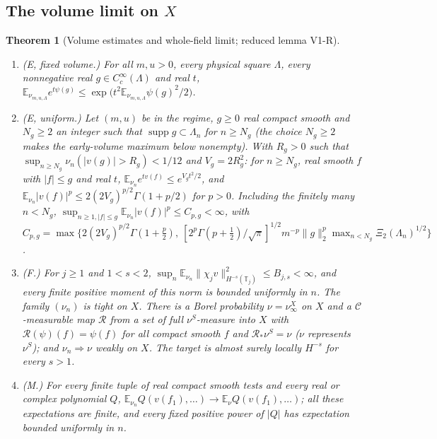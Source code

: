 \documentclass[11pt]{article}
\theoremstyle{plain}
\newtheorem{theorem}{Theorem}[section]
\theoremstyle{definition}
\theoremstyle{remark}
\newcommand{\E}{\mathbb{E}}
\newcommand{\T}{\mathbb{T}}
\newcommand{\cC}{\mathcal{C}}
\DeclareMathOperator{\supp}{supp}
\begin{document}
\subsection{The volume limit on $X$}\label{sec:V1}

\begin{theorem}[Volume estimates and whole-field limit; reduced lemma V1-R]\label{thm:V1}
\begin{enumerate}[label=(\roman*)]
\item \emph{(E, fixed volume.)} For all $m,u>0$, every physical square $\Lambda$, every
  nonnegative real $g\in C_c^{\infty}(\Lambda)$ and real $t$,
  $\E_{\nu_{m,u,\Lambda}}e^{t\psi(g)}\le\exp\bigl(t^{2}\E_{\nu_{m,u,\Lambda}}\psi(g)^{2}/2\bigr)$.
\item \emph{(E, uniform.)} Let $(m,u)$ be in the regime, $g\ge0$ real compact smooth
  and $N_g\ge2$ an integer such that $\supp g\subset\Lambda_n$ for $n\ge N_g$ (the
  choice $N_g\ge2$ makes the early-volume maximum below nonempty). With $R_g>0$ such that
  $\sup_{n\ge N_g}\nu_n(|v(g)|>R_g)<1/12$ and $V_g=2R_g^{2}$: for $n\ge N_g$, real smooth $f$
  with $|f|\le g$ and real $t$, $\E_{\nu_n}e^{tv(f)}\le e^{V_gt^{2}/2}$, and
  $\E_{\nu_n}|v(f)|^{p}\le2(2V_g)^{p/2}\Gamma(1+p/2)$ for $p>0$. Including the finitely many
  $n<N_g$, $\sup_{n\ge1,|f|\le g}\E_{\nu_n}|v(f)|^{p}\le C_{p,g}<\infty$, with
  $C_{p,g}=\max\{2(2V_g)^{p/2}\Gamma(1+\tfrac p2),\ [2^{p}\Gamma(p+\tfrac12)/\sqrt\pi]^{1/2}m^{-p}\|g\|_2^{p}
  \max_{n<N_g}\Xi_2(\Lambda_n)^{1/2}\}$.
\item \emph{(F.)} For $j\ge1$ and $1<s<2$,
  $\sup_n\E_{\nu_n}\|\chi_jv\|^{2}_{H^{-s}(\T_j)}\le B_{j,s}<\infty$, and every finite positive
  moment of this norm is bounded uniformly in $n$. The family $(\nu_n)$ is tight on
  $X$. There is a Borel probability $\nu=\nu^{X}_\infty$ on $X$ and a $\cC$-measurable map
  $\mathcal R$ from a set of full $\nu^{S}$-measure into $X$ with
  $\mathcal R(\psi)(f)=\psi(f)$ for all compact smooth $f$ and $\mathcal R_*\nu^{S}=\nu$
  ($\nu$ \emph{represents} $\nu^{S}$); and $\nu_n\Rightarrow\nu$ weakly on $X$. The target is
  almost surely locally $H^{-s}$ for every $s>1$.
\item \emph{(M.)} For every finite tuple of real compact smooth tests and every
  real or complex polynomial $Q$, $\E_{\nu_n}Q(v(f_1),\dots)\to\E_\nu Q(v(f_1),\dots)$; all
  these expectations are finite, and every fixed positive power of $|Q|$ has
  expectation bounded uniformly in $n$.
\end{enumerate}
\end{theorem}
\end{document}
